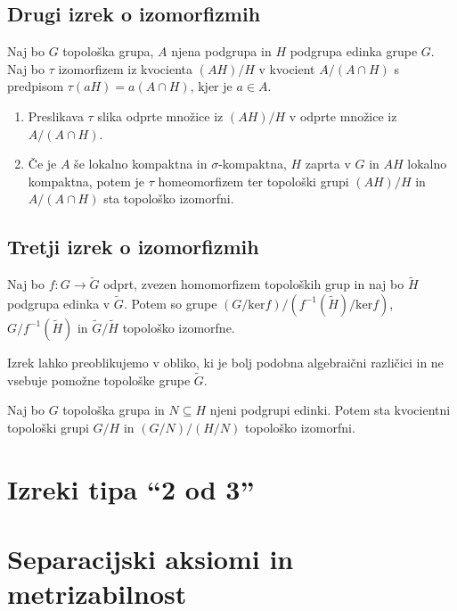 \documentclass[mat1]{fmfdelo}
\begin{document}
\subsection{Drugi izrek o izomorfizmih}
\begin{izrek}\label{izr:drugitopizrek}
Naj bo $G$ topološka grupa, $A$ njena podgrupa in $H$ podgrupa edinka grupe $G$. Naj bo $\tau$ izomorfizem iz kvocienta $(AH)/H$ v kvocient $A/(A \cap H)$ s predpisom $\tau (aH) = a(A \cap H)$, kjer je $a \in A$.
\begin{enumerate}
\item Preslikava $\tau$ slika odprte množice iz $(AH)/H$ v odprte množice iz $A/(A \cap H)$.
\item Če je $A$ še lokalno kompaktna in $\sigma$-kompaktna, $H$ zaprta v $G$ in $AH$ lokalno kompaktna, potem je $\tau$ homeomorfizem ter topološki grupi $(AH)/H$ in $A/(A \cap H)$ sta topološko izomorfni.
\end{enumerate}
\end{izrek}


\subsection{Tretji izrek o izomorfizmih}
\begin{izrek}\label{izr:predtretji}
	Naj bo $f\colon G \to \widetilde{G}$ odprt, zvezen homomorfizem topoloških grup in naj bo $\widetilde{H}$ podgrupa edinka v $\widetilde{G}$. Potem so grupe $(G/\text{ker}f)/(f^{-1}(\widetilde{H})/\text{ker}f)$, $G/f^{-1}(\widetilde{H})$ in $\widetilde{G}/\widetilde{H}$ topološko izomorfne.
\end{izrek}

Izrek lahko preoblikujemo v obliko, ki je bolj podobna algebraični različici in ne vsebuje pomožne topološke grupe $\widetilde{G}$.
\begin{izrek}\label{izr:tretjitopizrek}
Naj bo $G$ topološka grupa in $N \subseteq H$ njeni podgrupi edinki. Potem sta kvocientni topološki grupi $G/H$ in $(G/N)/(H/N)$ topološko izomorfni.
\end{izrek}

\section{Izreki tipa ``2 od 3''}

\section{Separacijski aksiomi in metrizabilnost}
\end{document}
